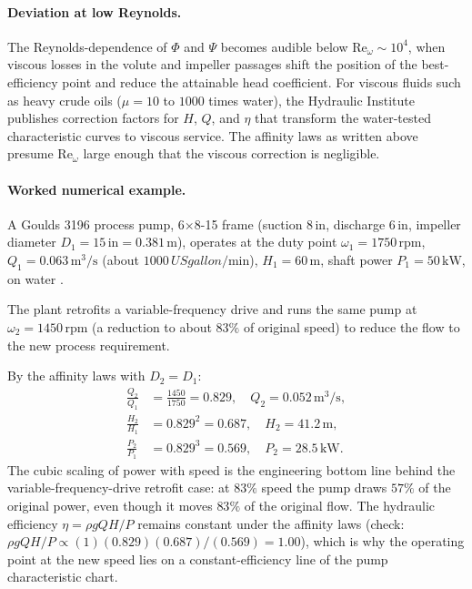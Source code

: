 \paragraph{Deviation at low Reynolds.} The Reynolds-dependence of
$\Phi$ and $\Psi$ becomes audible below $\mathrm{Re}_{\omega} \sim
10^{4}$, when viscous losses in the volute and impeller passages
shift the position of the best-efficiency point and reduce the
attainable head coefficient. For viscous fluids such as heavy
crude oils ($\mu = 10$ to $1000$ times water), the Hydraulic
Institute publishes correction factors for $H$, $Q$, and $\eta$
that transform the water-tested characteristic curves to viscous
service. The affinity laws as written above presume
$\mathrm{Re}_{\omega}$ large enough that the viscous correction
is negligible.

\paragraph{Worked numerical example.} A Goulds 3196 process pump,
6$\times$8-15 frame (suction $8\,\text{in}$, discharge $6\,\text{in}$,
impeller diameter $D_{1} = 15\,\text{in} = 0.381 \,\si{\meter}$),
operates at the duty point $\omega_{1} = 1750\,\text{rpm}$,
$Q_{1} = 0.063 \,\si{\meter\cubed\per\second}$ (about
$1000 \,\si{US gallon\per\minute}$), $H_{1} = 60 \,\si{\meter}$,
shaft power $P_{1} = 50 \,\si{\kilo\watt}$, on water
\cite{text:ch02t3-goulds-3196}.

The plant retrofits a variable-frequency drive and runs the same
pump at $\omega_{2} = 1450 \,\text{rpm}$ (a reduction to about
$83\%$ of original speed) to reduce the flow to the new process
requirement.

By the affinity laws with $D_{2} = D_{1}$:
\begin{align*}
\frac{Q_{2}}{Q_{1}} &= \frac{1450}{1750} = 0.829, \quad
Q_{2} = 0.052 \,\si{\meter\cubed\per\second}, \\
\frac{H_{2}}{H_{1}} &= 0.829^{2} = 0.687, \quad
H_{2} = 41.2 \,\si{\meter}, \\
\frac{P_{2}}{P_{1}} &= 0.829^{3} = 0.569, \quad
P_{2} = 28.5 \,\si{\kilo\watt}.
\end{align*}
The cubic scaling of power with speed is the engineering bottom
line behind the variable-frequency-drive retrofit case: at $83\%$
speed the pump draws $57\%$ of the original power, even though it
moves $83\%$ of the original flow. The hydraulic efficiency
$\eta = \rho g Q H / P$ remains constant under the affinity laws
(check: $\rho g Q H / P \propto (1)(0.829)(0.687)/(0.569) = 1.00$),
which is why the operating point at the new speed lies on a
constant-efficiency line of the pump characteristic chart.

